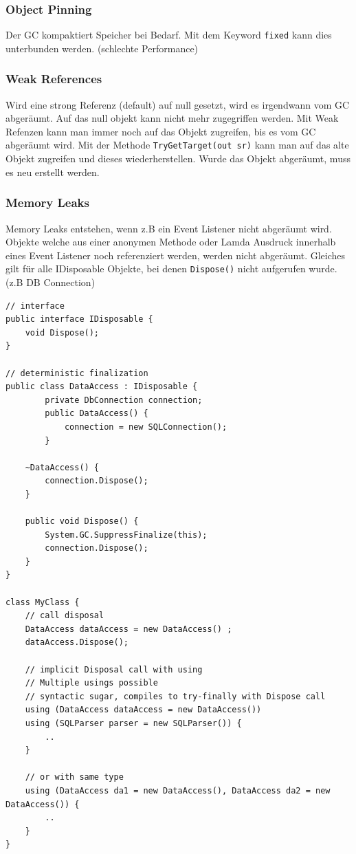 \subsubsection{Object Pinning} Der GC kompaktiert Speicher bei Bedarf. Mit dem Keyword \lstinline|fixed| kann dies unterbunden werden. (schlechte Performance)

\subsubsection{Weak References} Wird eine strong Referenz (default) auf null gesetzt, wird es irgendwann vom GC abgeräumt. Auf das null objekt kann nicht mehr zugegriffen werden. Mit Weak Refenzen kann man immer noch auf das Objekt zugreifen, bis es vom GC abgeräumt wird. Mit der Methode \lstinline|TryGetTarget(out sr)| kann man auf das alte Objekt zugreifen und dieses wiederherstellen. Wurde das Objekt abgeräumt, muss es neu erstellt werden.

\subsubsection{Memory Leaks} Memory Leaks entstehen, wenn z.B ein Event Listener nicht abgeräumt wird. Objekte welche aus einer anonymen Methode oder Lamda Ausdruck innerhalb eines Event Listener noch referenziert werden, werden nicht abgeräumt. Gleiches gilt für alle IDisposable Objekte, bei denen \lstinline|Dispose()| nicht aufgerufen wurde. (z.B DB Connection)

\begin{lstlisting}
// interface
public interface IDisposable {
	void Dispose();
}
	
// deterministic finalization
public class DataAccess : IDisposable {
		private DbConnection connection;
		public DataAccess() {
			connection = new SQLConnection();
		}
	
	~DataAccess() {
		connection.Dispose();
	}
	
	public void Dispose() {
		System.GC.SuppressFinalize(this);
		connection.Dispose();
	}
}

class MyClass {
	// call disposal
	DataAccess dataAccess = new DataAccess() ;
	dataAccess.Dispose();
	
	// implicit Disposal call with using
	// Multiple usings possible
	// syntactic sugar, compiles to try-finally with Dispose call
	using (DataAccess dataAccess = new DataAccess())
	using (SQLParser parser = new SQLParser()) {
		..
	}
	
	// or with same type
	using (DataAccess da1 = new DataAccess(), DataAccess da2 = new DataAccess()) {
		..
	}
}
\end{lstlisting}


